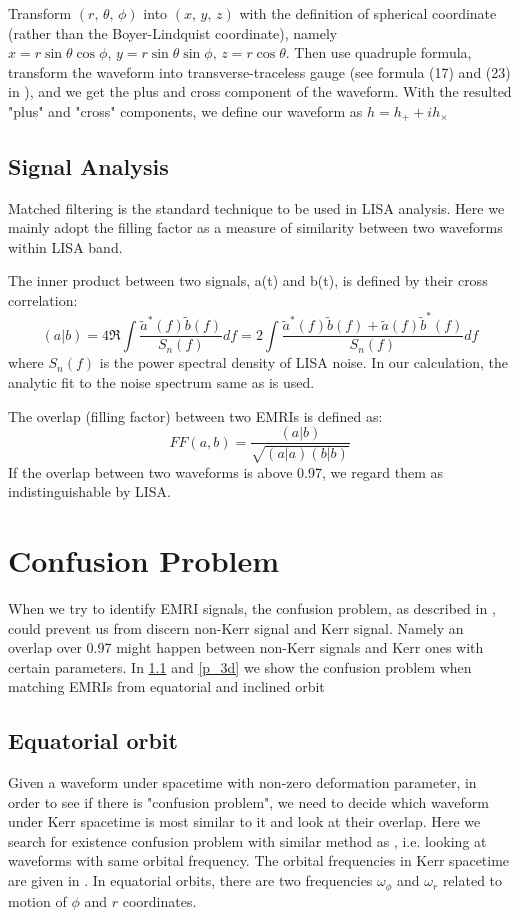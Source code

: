 \documentclass{article}
\begin{document}
Transform $(r,\,\theta,\,\phi)$ into $(x,\,y,\,z)$ with the definition of spherical coordinate (rather than the Boyer-Lindquist coordinate), namely $x=r\sin\theta \cos \phi,\, y=r\sin\theta\sin\phi,\, z=r\cos\theta$. Then use quadruple formula, transform the waveform into transverse-traceless gauge (see formula (17) and (23) in \cite{kludge}), and we get the plus and cross component of the waveform. With the resulted "plus" and "cross" components, we define our waveform as $h = h_+ + i h_\times$
\subsection{Signal Analysis}
\label{p_mf}
Matched filtering is the standard technique to be used in LISA analysis. Here we mainly adopt the filling factor as  a measure of similarity between two waveforms within LISA band. 

The inner product between two signals, a(t) and b(t), is defined by their cross correlation: \cite{product}
\begin{equation}
	(a|b)=4\Re\int \frac{\tilde{a}^*(f) \tilde{b}(f)}{S_n(f)}df =2\int \frac{\tilde{a}^*(f) \tilde{b}(f) +\tilde{a}(f) \tilde{b}^*(f) }{S_n(f)}df
\end{equation}
where $S_n(f)$ is the power spectral density of LISA noise. In our calculation, the analytic fit to the noise spectrum same as \cite{kludge} is used.

The overlap (filling factor) between two EMRIs is defined as:
\begin{equation}
	FF(a,b)=\frac{(a|b)}{\sqrt{(a|a)(b|b)}}
\end{equation}
If the overlap between two waveforms is above 0.97, we regard them as indistinguishable by LISA.

\section{Confusion Problem}
When we try to identify EMRI signals, the confusion problem, as described in \cite{sameOmg}, could prevent us from discern non-Kerr signal and Kerr signal. Namely an overlap over 0.97 might happen between non-Kerr signals and Kerr ones with certain parameters. In \ref{p_2d} and \ref{p_3d} we show the confusion problem when matching EMRIs from equatorial and inclined orbit 
\subsection{Equatorial orbit}
\label{p_2d}
Given a waveform under spacetime with non-zero deformation parameter, in order to see if there is "confusion problem", we need to decide which waveform under Kerr spacetime is most similar to it and look at their overlap. Here we search for existence confusion problem with similar method as \cite{majorPRD}, i.e. looking at waveforms with same orbital frequency. The orbital frequencies in Kerr spacetime are given in \cite{tauOmg}. In equatorial orbits, there are two frequencies $\omega_\phi$ and $\omega_r$ related to motion of $\phi$ and $r$ coordinates.
\end{document}
